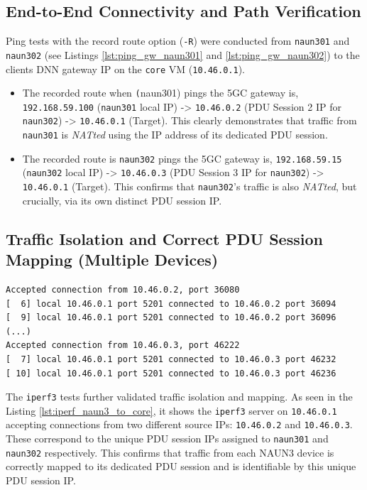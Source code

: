 \subsection{End-to-End Connectivity and Path Verification}

Ping tests with the record route option (\texttt{-R}) were conducted from \texttt{naun301} and \texttt{naun302} (see Listings \ref{lst:ping_gw_naun301} and \ref{lst:ping_gw_naun302}) to the clients \ac{DNN} gateway \ac{IP} on the \texttt{core} \ac{VM} (\texttt{10.46.0.1}).

\begin{itemize}
    \item The recorded route when \texttt(naun301) pings the \ac{5GC} gateway is, \texttt{192.168.59.100} (\texttt{naun301} local \ac{IP}) -> \texttt{10.46.0.2} (\ac{PDU} Session 2 \ac{IP} for \texttt{naun302}) -> \texttt{10.46.0.1} (Target). This clearly demonstrates that traffic from \texttt{naun301} is \textit{NATted} using the \ac{IP} address of its dedicated \ac{PDU} session.

    \item The recorded route is \texttt{naun302} pings the \ac{5GC} gateway is, \texttt{192.168.59.15} (\texttt{naun302} local \ac{IP}) -> \texttt{10.46.0.3} (\ac{PDU} Session 3 \ac{IP} for \texttt{naun302}) -> \texttt{10.46.0.1} (Target). This confirms that \texttt{naun302}'s traffic is also \textit{NATted}, but crucially, via its own distinct \ac{PDU} session \ac{IP}.
\end{itemize}

\subsection{Traffic Isolation and Correct \acs{PDU} Session Mapping (Multiple Devices)}

\begin{lstlisting}[caption=\texttt{iperf3} server session receiveing from both clients at \texttt{naun301} and \texttt{naun302} via it's seperate \acs{PDU} channels,label={lst:iperf_naun3_to_core}]
Accepted connection from 10.46.0.2, port 36080
[  6] local 10.46.0.1 port 5201 connected to 10.46.0.2 port 36094
[  9] local 10.46.0.1 port 5201 connected to 10.46.0.2 port 36096
(...)
Accepted connection from 10.46.0.3, port 46222
[  7] local 10.46.0.1 port 5201 connected to 10.46.0.3 port 46232
[ 10] local 10.46.0.1 port 5201 connected to 10.46.0.3 port 46236
\end{lstlisting}

The \texttt{iperf3} tests further validated traffic isolation and mapping. As seen in the Listing \ref{lst:iperf_naun3_to_core}, it shows the \texttt{iperf3} server on \texttt{10.46.0.1} accepting connections from two different source \acp{IP}: \texttt{10.46.0.2} and \texttt{10.46.0.3}. These correspond to the unique \ac{PDU} session \acp{IP} assigned to \texttt{naun301} and \texttt{naun302} respectively. This confirms that traffic from each \ac{NAUN3} device is correctly mapped to its dedicated \ac{PDU} session and is identifiable by this unique \ac{PDU} session \ac{IP}.

